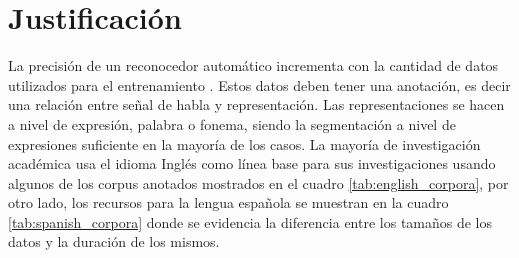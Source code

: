 \section{Justificación}

La precisión de un reconocedor automático incrementa con la cantidad de datos utilizados para el entrenamiento \cite{MooreAListeners}. Estos datos deben tener una anotación, es decir una relación entre señal de habla y representación. Las representaciones se hacen a nivel de expresión, palabra o fonema, siendo la segmentación a nivel de expresiones suficiente en la mayoría de los casos. La mayoría de investigación académica usa el idioma Inglés como línea base para sus investigaciones usando algunos de los corpus anotados mostrados en el cuadro \ref{tab:english_corpora}, por otro lado, los recursos para la lengua española se muestran en la cuadro \ref{tab:spanish_corpora} donde se evidencia la diferencia entre los tamaños de los datos y la duración de los mismos.





